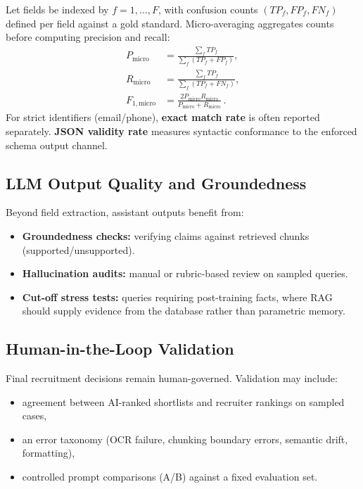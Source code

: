 Let fields be indexed by $f=1,\dots,F$, with confusion counts $(TP_f, FP_f, FN_f)$ defined per field against a gold standard. Micro-averaging aggregates counts before computing precision and recall:
\begin{align}
    P_{\mathrm{micro}} &= \frac{\sum_{f} TP_f}{\sum_{f} (TP_f + FP_f)}, \\
    R_{\mathrm{micro}} &= \frac{\sum_{f} TP_f}{\sum_{f} (TP_f + FN_f)}, \\
    F_{1,\mathrm{micro}} &= \frac{2 P_{\mathrm{micro}} R_{\mathrm{micro}}}{P_{\mathrm{micro}}+R_{\mathrm{micro}}}\,.
\end{align}
For strict identifiers (email/phone), \textbf{exact match rate} is often reported separately. \textbf{JSON validity rate} measures syntactic conformance to the enforced schema output channel.

\subsection{LLM Output Quality and Groundedness}
\label{sec:ch4:metrics_llm}

Beyond field extraction, assistant outputs benefit from:

\begin{itemize}
    \item \textbf{Groundedness checks:} verifying claims against retrieved chunks (supported/unsupported).
    \item \textbf{Hallucination audits:} manual or rubric-based review on sampled queries.
    \item \textbf{Cut-off stress tests:} queries requiring post-training facts, where RAG should supply evidence from the database rather than parametric memory.
\end{itemize}

\subsection{Human-in-the-Loop Validation}
\label{sec:ch4:human_validation}

Final recruitment decisions remain human-governed. Validation may include:

\begin{itemize}
    \item agreement between AI-ranked shortlists and recruiter rankings on sampled cases,
    \item an error taxonomy (OCR failure, chunking boundary errors, semantic drift, formatting),
    \item controlled prompt comparisons (A/B) against a fixed evaluation set.
\end{itemize}

